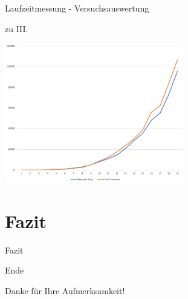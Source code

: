 \documentclass{beamer}
\begin{document}
    \begin{frame}{Laufzeitmessung - Versuchsauswertung}
        \begin{block}{zu III.}
            \begin{center}
                \includegraphics[width=7.8cm]{../auswertung.PNG}
            \end{center}
        \end{block}
    \end{frame}

    \section{Fazit}
    \begin{frame}{Fazit}

    \end{frame}

    \begin{frame}{Ende}
        \begin{center}
            Danke f\"ur Ihre Aufmerksamkeit!
        \end{center}
    \end{frame}
\end{document}
